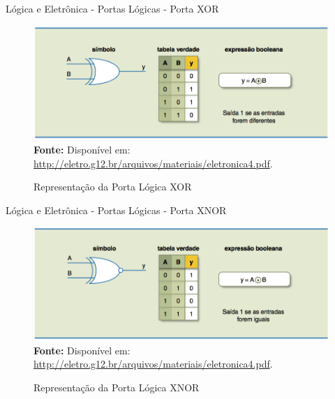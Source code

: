 	\begin{frame}{Lógica e Eletrônica - Portas Lógicas - Porta XOR}
		\begin{figure}[h]
			\centering
			\caption{Representação da Porta Lógica XOR}
			\includegraphics[height=0.66\textheight]{img/ed/ed-porta_xor.png}
			\\
			{\footnotesize \textbf{Fonte:} Disponível em: \url{http://eletro.g12.br/arquivos/materiais/eletronica4.pdf}.}
			\label{fig:ed-porta_XOR}
		\end{figure}
	\end{frame}

	\begin{frame}{Lógica e Eletrônica - Portas Lógicas - Porta XNOR}
		\begin{figure}[h]
			\centering
			\caption{Representação da Porta Lógica XNOR}
			\includegraphics[height=0.66\textheight]{img/ed/ed-porta_xnor.png}
			\\
			{\footnotesize \textbf{Fonte:} Disponível em: \url{http://eletro.g12.br/arquivos/materiais/eletronica4.pdf}.}
			\label{fig:ed-porta_XNOR}
		\end{figure}
	\end{frame}

